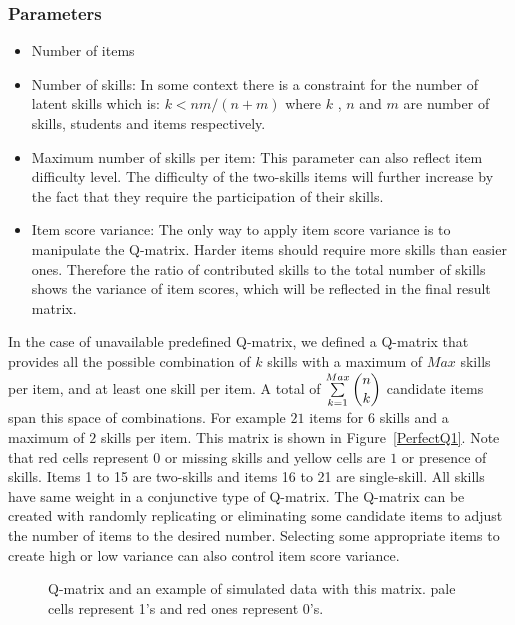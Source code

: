 \subsubsection{Parameters}
\begin{itemize}
\item Number of items 
\item Number of skills: In some context there is a constraint for the number of latent skills which is: $k<nm/(n+m)$ \protect\citep{lee1999learning} where $k$ , $n$ and $m$ are number of skills, students and items respectively.
\item Maximum number of skills per item: This parameter can also reflect item difficulty level. The difficulty of  the two-skills items will further increase by the fact that they require the participation of their skills.
\item Item score variance: The only way to apply item score variance is to manipulate the Q-matrix. Harder items should require more skills than easier ones. Therefore the ratio of contributed skills to the total number of skills shows the variance of item scores, which will be reflected in the final result matrix.
\end{itemize}



In the case of unavailable predefined Q-matrix, we defined a Q-matrix that provides all the possible combination of $k$ skills with a maximum of $Max$ skills per item, and at least one skill per item. A total of $\sum\limits_{k=1}^{Max} \dbinom{n}{k}$ candidate items span this space of combinations. For example $21$ items for $6$ skills and a maximum of $2$ skills per item. This matrix is shown in Figure~\ref{PerfectQ1}. Note that red cells represent $0$ or missing skills and yellow cells are $1$ or presence of skills. Items 1 to 15 are two-skills and items 16 to 21 are single-skill. All skills have same weight in a conjunctive type of Q-matrix. The Q-matrix can be created with randomly replicating or eliminating some candidate items to adjust the number of items to the desired number. Selecting some appropriate items to create high or low variance can also control item score variance.

\begin{figure}[ht]
\centering

\quad
\caption{Q-matrix and an example of simulated data with this matrix.  pale cells represent 1's and red ones represent 0's.}
\label{figqmatrixandResutM}
\end{figure}



